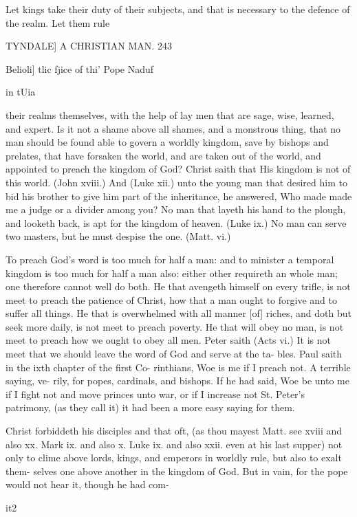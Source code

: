 \documentclass{custom}
\begin{document}
{Let kings take their duty of their subjects, and that is 
necessary to the defence of the realm. Let them rule 


TYNDALE]
A CHRISTIAN MAN.
243

Belioli] tlic 
fjice of thi' 
Pope Naduf 

in tUia 

their realms themselves, with the help of lay men that are 
sage, wise, learned, and expert. Is it not a shame above 
all shames, and a monstrous thing, that no man should be 
found able to govern a worldly kingdom, save by bishops and 
prelates, that have forsaken the world, and are taken out of
the world, and appointed to preach the kingdom of God?
Christ saith that His kingdom is not of this world. (John 
xviii.) And (Luke xii.) unto the young man that desired
him to bid his brother to give him part of the inheritance, 
he answered, Who made made me a judge or a divider 
among you? No man that layeth his hand to the plough, 
and looketh back, is apt for the kingdom of heaven. (Luke 
ix.) No man can serve two masters, but he must despise 
the one. (Matt. vi.) 

To preach God's word is too much for half a man: and 
to minister a temporal kingdom is too much for half a man 
also: either other requireth an whole man; one therefore 
cannot well do both. He that avengeth himself on every 
trifle, is not meet to preach the patience of Christ, how 
that a man ought to forgive and to suffer all things. He
that is overwhelmed with all manner [of] riches, and doth 
but seek more daily, is not meet to preach poverty. He 
that will obey no man, is not meet to preach how we ought 
to obey all men. Peter saith (Acts vi.) It is not meet 
that we should leave the word of God and serve at the ta-
bles. Paul saith in the ixth chapter of the first Co- 
rinthians, Woe is me if I preach not. A terrible saying, ve-
rily, for popes, cardinals, and bishops. If he had said, Woe 
be unto me if I fight not and move princes unto war, or if 
I increase not St. Peter's patrimony, (as they call it) it had 
been a more easy saying for them. 

Christ forbiddeth his disciples and that oft, (as thou mayest 
Matt. see xviii and also xx. Mark ix. and also x. Luke ix. and 
also xxii. even at his last supper) not only to clime above lords, 
kings, and emperors in worldly rule, but also to exalt them- 
selves one above another in the kingdom of God. But in 
vain, for the pope would not hear it, though he had com-

it2 

}
\end{document}
